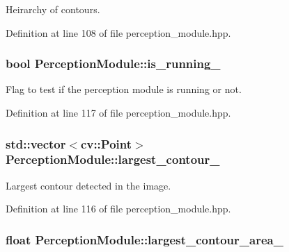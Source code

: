 Heirarchy of contours. 



Definition at line 108 of file perception\+\_\+module.\+hpp.

\subsubsection[{\texorpdfstring{is\+\_\+running\+\_\+}{is_running_}}]{\setlength{\rightskip}{0pt plus 5cm}bool Perception\+Module\+::is\+\_\+running\+\_\+\hspace{0.3cm}{\ttfamily [private]}}\hypertarget{class_perception_module_a95211a0bd4fe047b0e22e4afb7c50e26}{}\label{class_perception_module_a95211a0bd4fe047b0e22e4afb7c50e26}
Flag to test if the perception module is running or not. 

Definition at line 117 of file perception\+\_\+module.\+hpp.

\subsubsection[{\texorpdfstring{largest\+\_\+contour\+\_\+}{largest_contour_}}]{\setlength{\rightskip}{0pt plus 5cm}std\+::vector$<$cv\+::\+Point$>$ Perception\+Module\+::largest\+\_\+contour\+\_\+\hspace{0.3cm}{\ttfamily [private]}}\hypertarget{class_perception_module_a1bd3cb41f94fa253954018392a4ebdb9}{}\label{class_perception_module_a1bd3cb41f94fa253954018392a4ebdb9}


Largest contour detected in the image. 



Definition at line 116 of file perception\+\_\+module.\+hpp.

\subsubsection[{\texorpdfstring{largest\+\_\+contour\+\_\+area\+\_\+}{largest_contour_area_}}]{\setlength{\rightskip}{0pt plus 5cm}float Perception\+Module\+::largest\+\_\+contour\+\_\+area\+\_\+\hspace{0.3cm}{\ttfamily [private]}}\hypertarget{class_perception_module_aa20adfc7b4a473435fc98df6353b6fd6}{}\label{class_perception_module_aa20adfc7b4a473435fc98df6353b6fd6}


